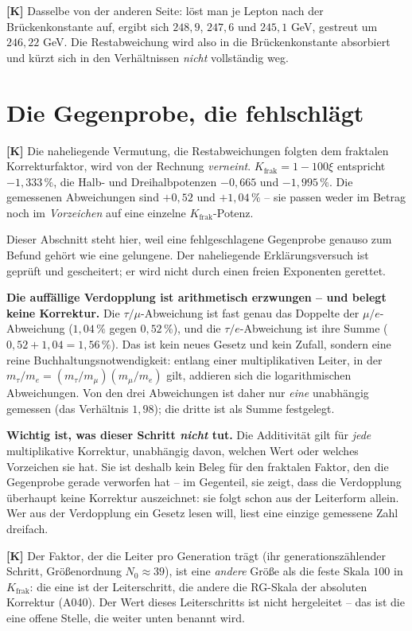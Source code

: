 \textbf{[K]} Dasselbe von der anderen Seite: löst man je Lepton nach der
Brückenkonstante auf, ergibt sich $248{,}9$, $247{,}6$ und $245{,}1$ GeV,
gestreut um $246{,}22$ GeV. Die Restabweichung wird also in die
Brückenkonstante absorbiert und kürzt sich in den Verhältnissen \emph{nicht}
vollständig weg.

\section{Die Gegenprobe, die fehlschlägt}

\textbf{[K]} Die naheliegende Vermutung, die Restabweichungen folgten dem
fraktalen Korrekturfaktor, wird von der Rechnung \emph{verneint}.
$K_\text{frak} = 1-100\xi$ entspricht $-1{,}333\,\%$, die Halb- und
Dreihalbpotenzen $-0{,}665$ und $-1{,}995\,\%$. Die gemessenen Abweichungen
sind $+0{,}52$ und $+1{,}04\,\%$ -- sie passen weder im Betrag noch im
\emph{Vorzeichen} auf eine einzelne $K_\text{frak}$-Potenz.

Dieser Abschnitt steht hier, weil eine fehlgeschlagene Gegenprobe genauso zum
Befund gehört wie eine gelungene. Der naheliegende Erklärungsversuch ist
geprüft und gescheitert; er wird nicht durch einen freien Exponenten gerettet.

\textbf{Die auffällige Verdopplung ist arithmetisch erzwungen -- und belegt
keine Korrektur.} Die $\tau/\mu$-Abweichung ist fast genau das Doppelte der
$\mu/e$-Abweichung ($1{,}04\,\%$ gegen $0{,}52\,\%$), und die $\tau/e$-Abweichung
ist ihre Summe ($0{,}52 + 1{,}04 = 1{,}56\,\%$). Das ist kein neues Gesetz und
kein Zufall, sondern eine reine Buchhaltungsnotwendigkeit: entlang einer
multiplikativen Leiter, in der $m_\tau/m_e = (m_\tau/m_\mu)(m_\mu/m_e)$ gilt,
addieren sich die logarithmischen Abweichungen. Von den drei Abweichungen ist
daher nur \emph{eine} unabhängig gemessen (das Verhältnis $1{,}98$); die dritte
ist als Summe festgelegt.

\textbf{Wichtig ist, was dieser Schritt \emph{nicht} tut.} Die Additivität gilt
für \emph{jede} multiplikative Korrektur, unabhängig davon, welchen Wert oder
welches Vorzeichen sie hat. Sie ist deshalb kein Beleg für den fraktalen Faktor,
den die Gegenprobe gerade verworfen hat -- im Gegenteil, sie zeigt, dass die
Verdopplung überhaupt keine Korrektur auszeichnet: sie folgt schon aus der
Leiterform allein. Wer aus der Verdopplung ein Gesetz lesen will, liest eine
einzige gemessene Zahl dreifach.

\textbf{[K]} Der Faktor, der die Leiter pro Generation trägt (ihr
generationszählender Schritt, Größenordnung $N_0 \approx 39$), ist eine
\emph{andere} Größe als die feste Skala $100$ in $K_\text{frak}$: die eine ist
der Leiterschritt, die andere die RG-Skala der absoluten Korrektur (A040). Der
Wert dieses Leiterschritts ist nicht hergeleitet -- das ist die eine offene
Stelle, die weiter unten benannt wird.

